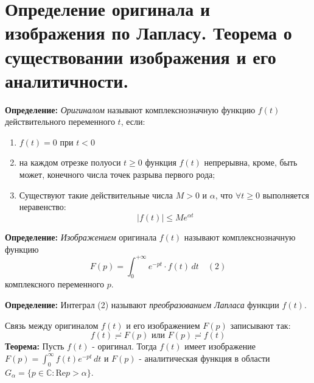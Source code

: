 \section{Определение оригинала и изображения по Лапласу. Теорема о
существовании изображения и его
аналитичности.}\label{ux43eux43fux440ux435ux434ux435ux43bux435ux43dux438ux435-ux43eux440ux438ux433ux438ux43dux430ux43bux430-ux438-ux438ux437ux43eux431ux440ux430ux436ux435ux43dux438ux44f-ux43fux43e-ux43bux430ux43fux43bux430ux441ux443.-ux442ux435ux43eux440ux435ux43cux430-ux43e-ux441ux443ux449ux435ux441ux442ux432ux43eux432ux430ux43dux438ux438-ux438ux437ux43eux431ux440ux430ux436ux435ux43dux438ux44f-ux438-ux435ux433ux43e-ux430ux43dux430ux43bux438ux442ux438ux447ux43dux43eux441ux442ux438.}

\textbf{Определение:} \emph{Оригиналом} называют комплекснозначную
функцию \(f(t)\) действительного переменного \(t\), если:

\begin{enumerate}
\def\labelenumi{\arabic{enumi}.}
\tightlist
\item
  \(f(t)=0\) при \(t<0\)
\item
  на каждом отрезке полуоси \(t\geq 0\) функция \(f(t)\) непрерывна,
  кроме, быть может, конечного числа точек разрыва первого рода;
\item
  Существуют такие действительные числа \(M>0\) и \(\alpha\), что
  \(\forall t\geq 0\) выполняется неравенство: \[
  |f(t)|\leq Me^{ \alpha t }
  \]
\end{enumerate}

\textbf{Определение:} \emph{Изображением} оригинала \(f(t)\) называют
комплекснозначную функцию \[
F(p)=\int_{0}^{+\infty}e^{ -pt }\cdot f(t)\,dt\quad(2)
\] комплексного переменного \(p\).

\textbf{Определение:} Интеграл (2) называют \emph{преобразованием
Лапласа} функции \(f(t)\).

Связь между оригиналом \(f(t)\) и его изображением \(F(p)\) записывают
так: \[
f(t)\risingdotseq F(p)\text{ или }F(p)\risingdotseq f(t)
\] \textbf{Теорема:} Пусть \(f(t)\) - оригинал. Тогда \(f(t)\) имеет
изображение \(F(p)=\int_{0}^{\infty}f(t)e^{ -pt }\,dt\) и \(F(p)\) -
аналитическая функция в области
\(G_{\alpha}=\{ p\in \mathbb{C}: \mathrm{Re}p>\alpha \}\).
